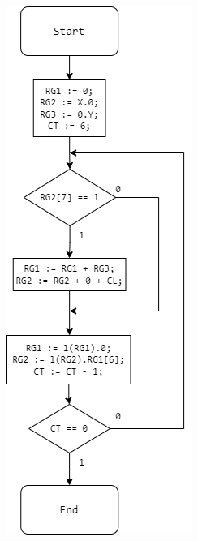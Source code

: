 \documentclass[12pt,a4paper]{article}
\begin{document}
    \begin{figure}[h!]
        \centering
        
        \begin{subfigure}[t]{0.45\textwidth}
            \centering
            \includegraphics[width=\linewidth]{structure3_alg.png}

\end{subfigure}
\end{figure}
\end{document}
